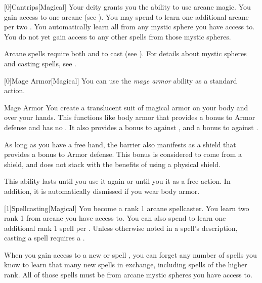         [0]{Cantrips}[Magical]
        Your deity grants you the ability to use arcane magic.
        You gain access to one arcane  (see ).
        You may spend  to learn one additional arcane  per two .
        You automatically learn all  from any mystic sphere you have access to.
        You do not yet gain access to any other spells from those mystic spheres.

        Arcane spells require both  and  to cast (see ).
        For details about mystic spheres and casting spells, see .

        [0]{Mage Armor}[Magical] You can use the \textit{mage armor} ability as a standard action.
        \begin{freeability}{Mage Armor}
            You create a translucent suit of magical armor on your body and over your hands.
            This functions like body armor that provides a  bonus to Armor defense and has no .
            It also provides a  bonus to  against , and a  bonus to  against .

            As long as you have a free hand, the barrier also manifests as a shield that provides a  bonus to Armor defense.
            This bonus is considered to come from a shield, and does not stack with the benefits of using a physical shield.

            This ability lasts until you use it again or until you  it as a free action.
            In addition, it is automatically dismissed if you wear body armor.
        \end{freeability}

        [1]{Spellcasting}[Magical]
        You become a rank 1 arcane spellcaster.
        You learn two rank 1  from arcane  you have access to.
        You can also spend  to learn one additional rank 1 spell per .
        Unless otherwise noted in a spell's description, casting a spell requires a .

        When you gain access to a new  or spell ,
            you can forget any number of spells you know to learn that many new spells in exchange,
            including spells of the higher rank.
        All of those spells must be from arcane mystic spheres you have access to.

